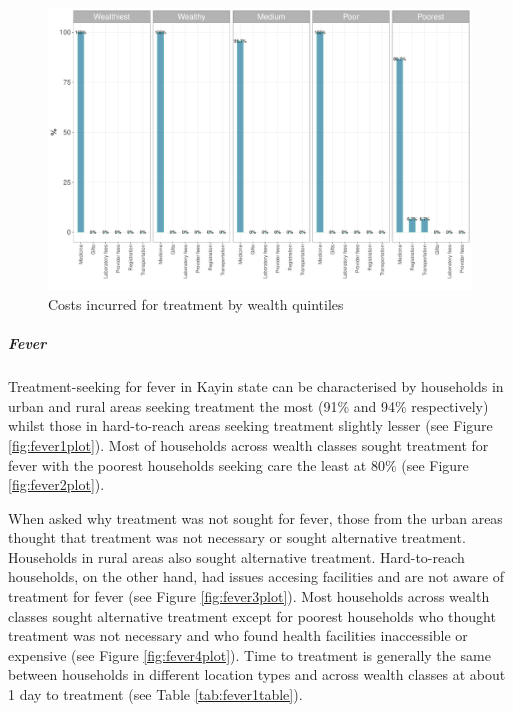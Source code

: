 \documentclass[12pt,a4paper]{article}
\let\oldsubparagraph\subparagraph
\renewcommand{\subparagraph}[1]{\oldsubparagraph{#1}\mbox{}}
\begin{document}
\begin{figure}[H]

{\centering \includegraphics{kayinReport_files/figure-latex/ari8plot-1} 

}

\caption{Costs incurred for treatment by wealth quintiles}\label{fig:ari8plot}
\end{figure}

\hypertarget{fever}{%
\subparagraph{Fever}\label{fever}}

Treatment-seeking for fever in Kayin state can be characterised by households in urban and rural areas seeking treatment the most (91\% and 94\% respectively) whilst those in hard-to-reach areas seeking treatment slightly lesser (see Figure \ref{fig:fever1plot}). Most of households across wealth classes sought treatment for fever with the poorest households seeking care the least at 80\% (see Figure \ref{fig:fever2plot}).

When asked why treatment was not sought for fever, those from the urban areas thought that treatment was not necessary or sought alternative treatment. Households in rural areas also sought alternative treatment. Hard-to-reach households, on the other hand, had issues accesing facilities and are not aware of treatment for fever (see Figure \ref{fig:fever3plot}). Most households across wealth classes sought alternative treatment except for poorest households who thought treatment was not necessary and who found health facilities inaccessible or expensive (see Figure \ref{fig:fever4plot}). Time to treatment is generally the same between households in different location types and across wealth classes at about 1 day to treatment (see Table \ref{tab:fever1table}).
\end{document}
